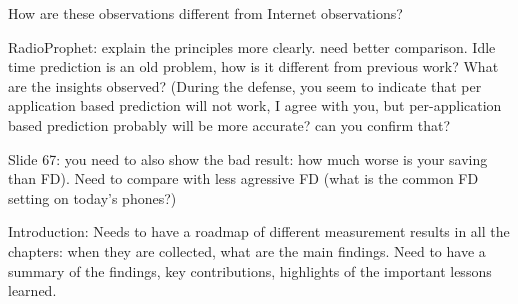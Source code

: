 {How are these observations different from Internet observations?

RadioProphet:  explain the principles more clearly.  need better comparison.
Idle time prediction is an old problem, how is it different from previous work?
What are the insights observed?
(During the defense, you seem to indicate that per application based prediction will not work, I agree with you, but per-application based prediction probably will be more accurate?  can you confirm that?

Slide 67: you need to also show the bad result: how much worse is your saving than FD).
Need to compare with less agressive FD (what is the common FD setting on today's phones?)

Introduction:
Needs to have a roadmap of different measurement results in all the chapters: when they are collected, what are the main findings.
Need to have a summary of the findings, key contributions, highlights of the important lessons learned.


}

\label{Abstract}
